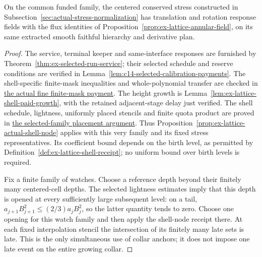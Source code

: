 \begin{corollary}
\label{cor:c14-selected-annular-responses}
On the common funded family, the centered conserved stress constructed in
Subsection~\ref{sec:actual-stress-normalization} has translation and rotation
response fields with the flux identities of
Proposition~\ref{prop:ex-lattice-annular-field}, on its same extracted
smooth faithful hierarchy and derivative plan.
\end{corollary}
\begin{proof}
The service, terminal keeper and same-interface responses are furnished by
Theorem~\ref{thm:ex-selected-run-service}; their selected schedule and
reserve conditions are verified in
Lemma~\ref{lem:c14-selected-calibration-payments}. The shell-specific
finite-mask inequalities and whole-polynomial transfer are checked in
\hyperref[par:shell-actual-mask]{the actual fine finite-mask payment}.
The height growth is Lemma~\ref{lem:ex-lattice-shell-paid-growth},
with the retained adjacent-stage delay just verified. The shell schedule,
lightness, uniformly placed stencils and finite quota product are proved
in \hyperref[par:shell-actual-placement]{the selected-family placement
argument}. Thus Proposition~\ref{prop:ex-lattice-actual-shell-node}
applies with this very family and its fixed stress representatives.
Its coefficient bound depends on the birth level, as permitted by
Definition~\ref{def:ex-lattice-shell-receipt}; no uniform bound over
birth levels is required.

Fix a finite family of watches. Choose a reference depth beyond their
finitely many centered-cell depths. The selected lightness estimates
imply that this depth is opened at every sufficiently large subsequent
level: on a tail, $a_{j+1}B_{j+1}^2\le(2/3)a_jB_j^2$, so the latter
quantity tends to zero. Choose one opening for this watch family and
then apply the shell-node receipt there. At each fixed interpolation
stencil the intersection of its finitely many late sets is late. This
is the only simultaneous use of collar anchors; it does not impose
one late event on the entire growing collar.


\end{proof}
